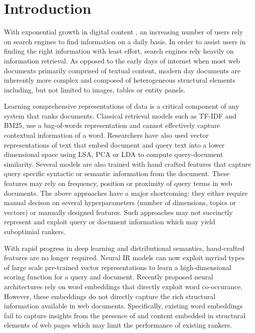 \section{Introduction}
\label{sec:introduction}
With exponential growth in digital content , an increasing number of users rely 
on search engines to find information on a daily basis. In order to assist users 
in finding the right information with least effort, search engines rely heavily 
on information retrieval. As opposed to the early days of 
internet when most web documents primarily comprised of textual content, modern 
day documents are inherently more complex and composed of heterogeneous 
structural elements including, but not limited to images, tables or entity 
panels.

Learning comprehensive representations of data is a critical component of any 
system that ranks documents. Classical retrieval models such as TF-IDF and BM25, 
use a bag-of-words representation and cannot effectively capture contextual 
information of a word. Researchers have also used vector representations of text 
that embed document and query text into a lower dimensional space using 
LSA\cite{deerwester1990indexing}, PCA\cite{jolliffe1986principal} 
or LDA\cite{blei2003latent} to compute query-document similarity. Several models are also 
trained with hand crafted features \cite{Cao2006Sigir,Burges2010Report,Chapelle2011Yahoo} 
that capture query specific syntactic or semantic information from the document. 
These features may rely on frequency, position or proximity of query terms in web documents. 
The above approaches have a major shortcoming: they either require manual decison on several 
hyperparameters (number of dimensions, topics or vectors) or manually 
designed features. Such approaches may not succinctly represent and exploit query 
or document information which may yield suboptimial rankers. 


With rapid progress 
in deep learning and distributional semantics, hand-crafted features are no 
longer required. Neural IR models can now exploit myriad types of large 
scale pre-trained vector representations to learn a high-dimensional scoring 
function for a query and document.
Recently proposed neural architectures \cite{zheng2015learning,zamani2016estimating,mitra2015query} 
rely on word embeddings that directly 
exploit word co-occurance. However, these embeddings do not 
directly capture the rich structural information available in web documents.  
Specifically, existing word embeddings fail to capture insights 
from the presence of and content embedded in structural elements of web pages 
which may limit the performance of existing rankers. 

